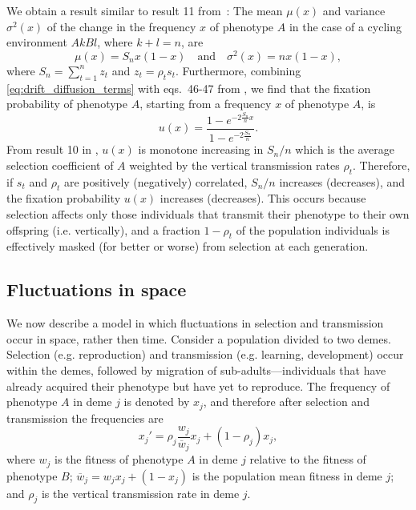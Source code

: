 \documentclass[14pt]{extarticle}
\begin{document}
We obtain a result similar to result 11 from~\citet{Ram2018}:
The mean $\mu(x)$ and variance $\sigma^2(x)$ of the change in the frequency $x$ of phenotype $A$ in the case of a cycling environment $AkBl$, where $k+l=n$, are
\begin{equation} \label{eq:drift_diffusion_terms}
\mu(x) = S_n x(1-x)
\quad \text{and} \quad
\sigma^2(x) = n x (1-x),
\end{equation}
where $S_n = \sum_{t=1}^{n}{z_t}$ and $z_t = \rho_t s_t$.
Furthermore, combining \eqref{eq:drift_diffusion_terms} with eqs.~46-47 from \citet{Ram2018}, we find that the fixation probability of phenotype $A$, starting from a frequency $x$ of phenotype $A$, is
\begin{equation}
u(x) = \frac{1 - e^{-2 \frac{S_n}{n} x}}{1 - e^{-2 \frac{S_n}{n}}}.
\end{equation}
From result 10 in \citep{Ram2018}, $u(x)$ is monotone increasing in $S_n/n$ which is the average selection coefficient of $A$ weighted by the vertical transmission rates $\rho_t$.
Therefore, if $s_t$ and $\rho_t$ are positively (negatively) correlated, $S_n/n$ increases (decreases), and the fixation probability $u(x)$ increases (decreases). 
This occurs because selection  affects only those individuals that transmit their phenotype to their own offspring (i.e. vertically), and a fraction $1-\rho_t$ of the population individuals is effectively masked (for better or worse) from selection at each generation.

\subsection*{Fluctuations in space}

We now describe a model in which fluctuations in selection and transmission occur in space, rather then time. Consider a population divided to two demes.
Selection (e.g. reproduction) and transmission (e.g. learning, development) occur within the demes, followed by migration of sub-adults---individuals that have already acquired their phenotype but have yet to reproduce.
The frequency of phenotype $A$ in deme $j$ is denoted by $x_j$, and therefore after selection and transmission the frequencies are 
\begin{equation} \label{eq:migration_model_selection_transmission}
x_j' = \rho_j \frac{w_j}{\overline{w}_j} x_j + (1-\rho_j) x_j,
\end{equation}
where $w_j$ is the fitness of phenotype $A$ in deme $j$ relative to the fitness of phenotype $B$; $\overline{w}_j=w_j x_j + (1-x_j)$ is the population mean fitness in deme $j$; and $\rho_j$ is the vertical transmission rate in deme $j$.
\end{document}
